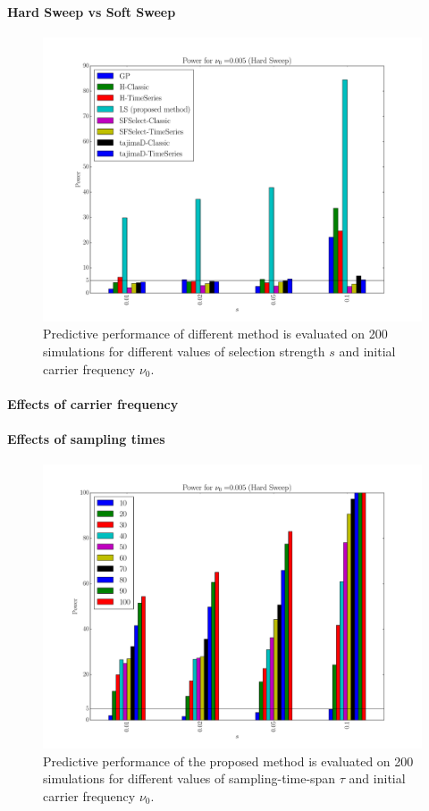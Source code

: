 \documentclass[11pt]{article}
\begin{document}
\paragraph{Hard Sweep vs Soft Sweep}
\begin{figure}
	\centering
	\includegraphics[trim=2.2in 0 2.2in 0 , clip,width=\textwidth]{power}
		\caption{Predictive performance of different method is evaluated on 200 
		simulations for different values of selection strength $s$ and initial 
		carrier frequency $\nu_0$.} \label{fig:power}
\end{figure}



\paragraph{Effects of carrier frequency}
\paragraph{Effects of sampling times}
\begin{figure}
	\centering
	\includegraphics[trim=2.2in 0 2.2in 0 , clip,width=\textwidth]{powerTime}
			\caption{Predictive performance of the proposed method is evaluated 
			on 200 simulations for different values of sampling-time-span 
			$\tau$ and initial carrier frequency $\nu_0$.} \label{fig:powert}
\end{figure}
\end{document}
